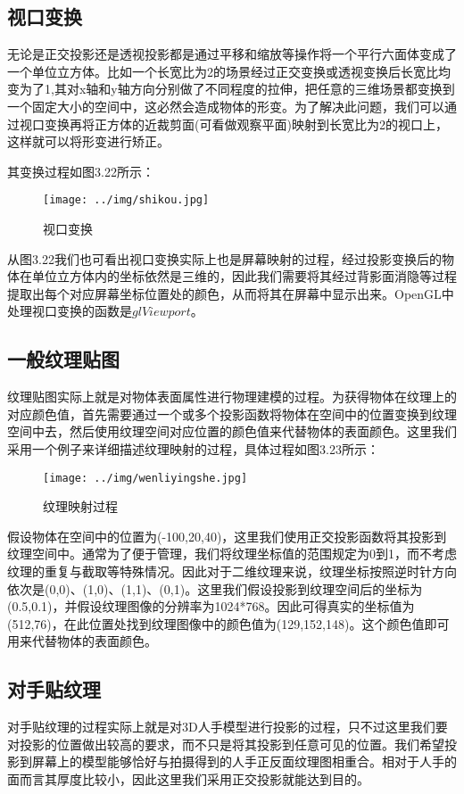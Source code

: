 \subsection{视口变换}
无论是正交投影还是透视投影都是通过平移和缩放等操作将一个平行六面体变成了一个单位立方体。比如一个长宽比为2的场景经过正交变换或透视变换后长宽比均变为了1,其对x轴和y轴方向分别做了不同程度的拉伸，把任意的三维场景都变换到一个固定大小的空间中，这必然会造成物体的形变。为了解决此问题，我们可以通过视口变换再将正方体的近裁剪面(可看做观察平面)映射到长宽比为2的视口上，这样就可以将形变进行矫正。

其变换过程如图3.22所示：
\begin{figure}[htb]
\centering
\texttt{[image: ../img/shikou.jpg]}
\caption{视口变换}
\label{fig：graph}
\end{figure} 

从图3.22我们也可看出视口变换实际上也是屏幕映射的过程，经过投影变换后的物体在单位立方体内的坐标依然是三维的，因此我们需要将其经过背影面消隐等过程提取出每个对应屏幕坐标位置处的颜色，从而将其在屏幕中显示出来。OpenGL中处理视口变换的函数是$glViewport$。

\subsection{一般纹理贴图}
纹理贴图实际上就是对物体表面属性进行物理建模的过程。为获得物体在纹理上的对应颜色值，首先需要通过一个或多个投影函数将物体在空间中的位置变换到纹理空间中去，然后使用纹理空间对应位置的颜色值来代替物体的表面颜色。这里我们采用一个例子来详细描述纹理映射的过程，具体过程如图3.23所示\cite{Tomas02}：

\begin{figure}[htb]
\centering
\texttt{[image: ../img/wenliyingshe.jpg]}
\caption{纹理映射过程}
\label{fig：graph}
\end{figure} 

假设物体在空间中的位置为(-100,20,40)，这里我们使用正交投影函数将其投影到纹理空间中。通常为了便于管理，我们将纹理坐标值的范围规定为0到1\cite{Everitt01}，而不考虑纹理的重复与截取等特殊情况。因此对于二维纹理来说，纹理坐标按照逆时针方向依次是(0,0)、(1,0)、(1,1)、(0,1)。这里我们假设投影到纹理空间后的坐标为(0.5,0.1)，并假设纹理图像的分辨率为1024*768。因此可得真实的坐标值为(512,76)，在此位置处找到纹理图像中的颜色值为(129,152,148)。这个颜色值即可用来代替物体的表面颜色。

\subsection{对手贴纹理}
对手贴纹理的过程实际上就是对3D人手模型进行投影的过程，只不过这里我们要对投影的位置做出较高的要求，而不只是将其投影到任意可见的位置。我们希望投影到屏幕上的模型能够恰好与拍摄得到的人手正反面纹理图相重合。相对于人手的面而言其厚度比较小，因此这里我们采用正交投影就能达到目的。


